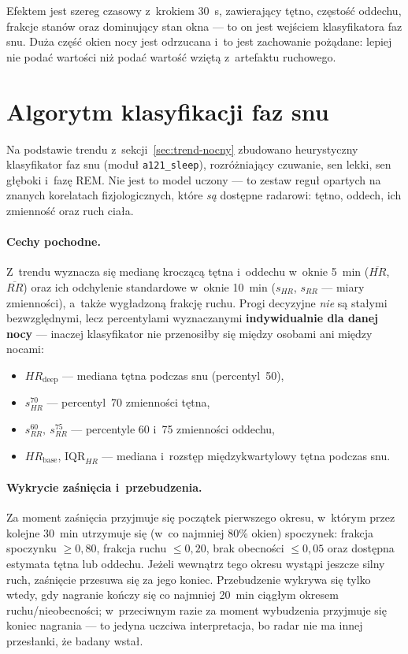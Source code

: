 \documentclass[12pt,a4paper,oneside]{report}
\begin{document}
Efektem jest szereg czasowy z~krokiem \SI{30}{s}, zawierający tętno, częstość
oddechu, frakcje stanów oraz dominujący stan okna --- to on jest wejściem
klasyfikatora faz snu. Duża część okien nocy jest odrzucana i~to jest
zachowanie pożądane: lepiej nie podać wartości niż podać wartość wziętą
z~artefaktu ruchowego.

\section{Algorytm klasyfikacji faz snu}
\label{sec:algorytm-snu}
Na podstawie trendu z~sekcji~\ref{sec:trend-nocny} zbudowano heurystyczny
klasyfikator faz snu (moduł \texttt{a121\_sleep}), rozróżniający czuwanie,
sen lekki, sen głęboki i~fazę REM. Nie jest to model uczony --- to zestaw
reguł opartych na znanych korelatach fizjologicznych, które \emph{są}
dostępne radarowi: tętno, oddech, ich zmienność oraz ruch ciała.

\paragraph{Cechy pochodne.} Z~trendu wyznacza się medianę kroczącą tętna
i~oddechu w~oknie \SI{5}{min} ($\overline{HR}$, $\overline{RR}$) oraz ich
odchylenie standardowe w~oknie \SI{10}{min} ($s_{HR}$, $s_{RR}$ --- miary
zmienności), a~także wygładzoną frakcję ruchu. Progi decyzyjne \emph{nie} są
stałymi bezwzględnymi, lecz percentylami wyznaczanymi \textbf{indywidualnie
dla danej nocy} --- inaczej klasyfikator nie przenosiłby się między osobami
ani między nocami:
\begin{itemize}
  \item $HR_{\text{deep}}$ --- mediana tętna podczas snu (percentyl~50),
  \item $s_{HR}^{70}$ --- percentyl~70 zmienności tętna,
  \item $s_{RR}^{60},\ s_{RR}^{75}$ --- percentyle 60 i~75 zmienności oddechu,
  \item $HR_{\text{base}}$, $\mathrm{IQR}_{HR}$ --- mediana i~rozstęp
  międzykwartylowy tętna podczas snu.
\end{itemize}

\paragraph{Wykrycie zaśnięcia i~przebudzenia.} Za moment zaśnięcia przyjmuje
się początek pierwszego okresu, w~którym przez kolejne \SI{30}{min} utrzymuje
się (w~co najmniej 80\% okien) spoczynek: frakcja spoczynku $\geq 0{,}80$,
frakcja ruchu $\leq 0{,}20$, brak obecności $\leq 0{,}05$ oraz dostępna
estymata tętna lub oddechu. Jeżeli wewnątrz tego okresu wystąpi jeszcze silny
ruch, zaśnięcie przesuwa się za jego koniec. Przebudzenie wykrywa się tylko
wtedy, gdy nagranie kończy się co najmniej \SI{20}{min} ciągłym okresem
ruchu/nieobecności; w~przeciwnym razie za moment wybudzenia przyjmuje się
koniec nagrania --- to jedyna uczciwa interpretacja, bo radar nie ma innej
przesłanki, że badany wstał.
\end{document}
